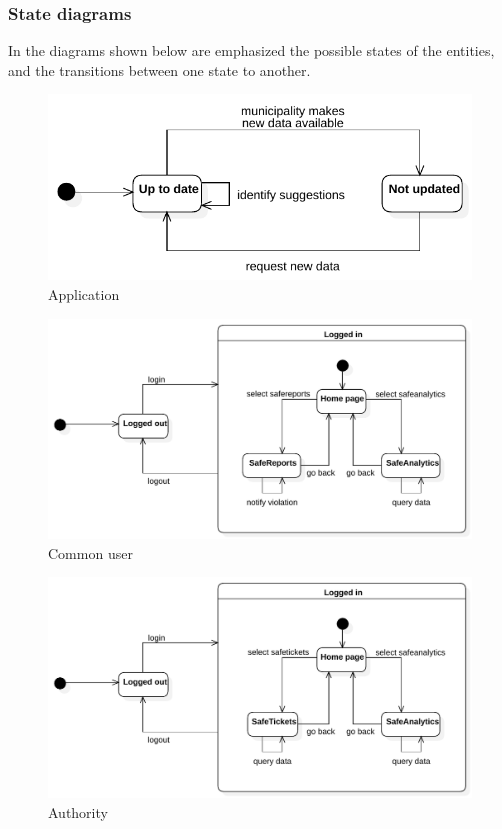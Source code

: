 \documentclass[a4paper]{article}
\begin{document}
\subsubsection{State diagrams}

In the diagrams shown below are emphasized the possible states of the
entities, and the transitions between one state to another.

\begin{figure}[H]
\centering
\includegraphics[width=\textwidth]{state_diagram_application}
\caption{Application}
\end{figure}

\begin{figure}[H]
\centering
\includegraphics[width=\textwidth]{state_diagram_common_user}
\caption{Common user}
\end{figure}

\begin{figure}[H]
\centering
\includegraphics[width=\textwidth]{state_diagram_authority}
\caption{Authority}
\end{figure}
\end{document}

